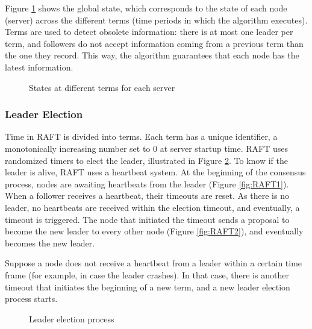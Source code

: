 \documentclass[12pt,a4paper]{article}
\begin{document}
Figure \ref{fig:state_empty} shows the global state, which corresponds to the state of each node (server) across the different terms (time periods in which the algorithm executes). Terms are used to detect obsolete information: there is at most one leader per term, and followers do not accept information coming from a previous term than the one they record. This way, the algorithm guarantees that each node has the latest information.

\begin{figure}
    \centering
    \qquad
    \caption{States at different terms for each server}%
    \label{fig:state_empty}%
\end{figure}
 

\subsubsection{Leader Election}
Time in RAFT is divided into terms. Each term has a unique identifier, a monotonically increasing number set to 0 at server startup time. RAFT uses randomized timers to elect the leader, illustrated in Figure  \ref{fig:le_1}. To know if the leader is alive, RAFT uses a heartbeat system. At the beginning of the consensus process, nodes are awaiting heartbeats from the leader (Figure \ref{fig:RAFT1}). When a follower receives a heartbeat, their timeouts are reset. As there is no leader, no heartbeats are received within the election timeout, and eventually, a timeout is triggered. The node that initiated the timeout sends a proposal to become the new leader to every other node (Figure \ref{fig:RAFT2}), and eventually becomes the new leader.

Suppose a node does not receive a heartbeat from a leader within a certain time frame (for example, in case the leader crashes). In that case, there is another timeout that initiates the beginning of a new term, and a new leader election process starts.

\begin{figure}
    \centering
    \qquad
    \caption{Leader election process}%
    \label{fig:le_1}%
\end{figure}
\end{document}
